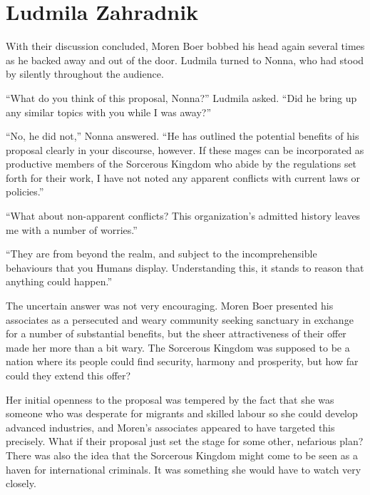 \chapter{Ludmila Zahradnik}

With their discussion concluded, Moren Boer bobbed his head again several times as he backed away and out of the door. Ludmila turned to Nonna, who had stood by silently throughout the audience.

 

“What do you think of this proposal, Nonna?” Ludmila asked. “Did he bring up any similar topics with you while I was away?”

 

“No, he did not,” Nonna answered. “He has outlined the potential benefits of his proposal clearly in your discourse, however. If these mages can be incorporated as productive members of the Sorcerous Kingdom who abide by the regulations set forth for their work, I have not noted any apparent conflicts with current laws or policies.”

 

“What about non-apparent conflicts? This organization’s admitted history leaves me with a number of worries.”

 

“They are from beyond the realm, and subject to the incomprehensible behaviours that you Humans display. Understanding this, it stands to reason that anything could happen.”

 

The uncertain answer was not very encouraging. Moren Boer presented his associates as a persecuted and weary community seeking sanctuary in exchange for a number of substantial benefits, but the sheer attractiveness of their offer made her more than a bit wary. The Sorcerous Kingdom was supposed to be a nation where its people could find security, harmony and prosperity, but how far could they extend this offer?

 

Her initial openness to the proposal was tempered by the fact that she was someone who was desperate for migrants and skilled labour so she could develop advanced industries, and Moren’s associates appeared to have targeted this precisely. What if their proposal just set the stage for some other, nefarious plan? There was also the idea that the Sorcerous Kingdom might come to be seen as a haven for international criminals. It was something she would have to watch very closely.

